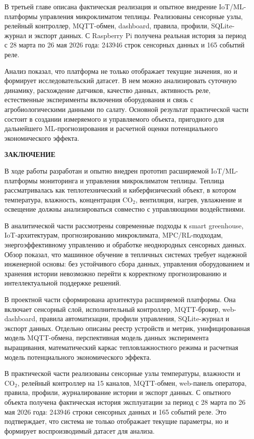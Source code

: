 \documentclass[a4paper,14pt]{extarticle}
\newcommand{\VkrStructuralSection}[1]{%
  \FloatBarrier
  \clearpage
  \phantomsection
  \addcontentsline{toc}{section}{#1}%
  \begin{center}\bfseries #1\end{center}%
  \par\nopagebreak\vspace{12pt}%
}
\begin{document}
В третьей главе описана фактическая реализация и опытное внедрение
IoT/ML-платформы управления микроклиматом теплицы. Реализованы сенсорные
узлы, релейный контроллер, MQTT-обмен, dashboard, правила, профили,
SQLite-журнал и экспорт данных. С Raspberry Pi получена реальная история
за период с 28 марта по 26 мая 2026 года: 243946 строк сенсорных данных
и 165 событий реле.

Анализ показал, что платформа не только отображает текущие значения, но
и формирует исследовательский датасет. В нем можно анализировать
суточную динамику, расхождение датчиков, качество данных, активность
реле, естественные эксперименты включения оборудования и связь с
агробиологическими данными по салату. Основной результат практической
части состоит в создании измеряемого и управляемого объекта, пригодного
для дальнейшего ML-прогнозирования и расчетной оценки потенциального
экономического эффекта.

\VkrStructuralSection{ЗАКЛЮЧЕНИЕ}\label{ux437ux430ux43aux43bux44eux447ux435ux43dux438ux435}

В ходе работы разработан и опытно внедрен прототип расширяемой
IoT/ML-платформы мониторинга и управления микроклиматом теплицы. Теплица
рассматривалась как теплотехнический и киберфизический объект, в котором
температура, влажность, концентрация CO\(_2\), вентиляция, нагрев,
увлажнение и освещение должны анализироваться совместно с управляющими
воздействиями.

В аналитической части рассмотрены современные подходы к smart
greenhouse, IoT-архитектурам, прогнозированию микроклимата,
MPC/RL-подходам, энергоэффективному управлению и обработке неоднородных
сенсорных данных. Обзор показал, что машинное обучение в тепличных
системах требует надежной инженерной основы: без устойчивого сбора
данных, управления оборудованием и хранения истории невозможно перейти к
корректному прогнозированию и интеллектуальной поддержке решений.

В проектной части сформирована архитектура расширяемой платформы. Она
включает сенсорный слой, исполнительный контроллер, MQTT-брокер,
web-dashboard, правила автоматизации, профили управления, SQLite-журнал
и экспорт данных. Отдельно описаны реестр устройств и метрик,
унифицированная модель MQTT-обмена, перспективная модель данных
эксперимента выращивания, математический каркас тепловлажностного режима
и расчетная модель потенциального экономического эффекта.

В практической части реализованы сенсорные узлы температуры, влажности и
CO\(_2\), релейный контроллер на 15 каналов, MQTT-обмен, web-панель
оператора, правила, профили, журналирование истории и экспорт данных. С
опытного объекта получена фактическая история эксплуатации за период с
28 марта по 26 мая 2026 года: 243946 строки сенсорных данных и 165
событий реле. Это подтверждает, что система не только отображает текущие
параметры, но и формирует воспроизводимый датасет для анализа.
\end{document}
